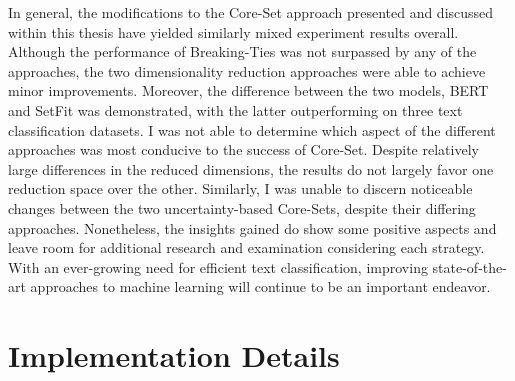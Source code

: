 \documentclass[english,bachelor,ul]{webisthesis} %
\begin{document}
In general, the modifications to the Core-Set approach presented and discussed within this thesis have yielded similarly mixed experiment results overall. Although the performance of Breaking-Ties was not surpassed by any of the approaches, the two dimensionality reduction approaches were able to achieve minor improvements. Moreover, the difference between the two models, BERT and SetFit was demonstrated, with the latter outperforming on three text classification datasets. I was not able to determine which aspect of the different approaches was most conducive to the success of Core-Set. Despite relatively large differences in the reduced dimensions, the results do not largely favor one reduction space over the other. Similarly, I was unable to discern noticeable changes between the two uncertainty-based Core-Sets, despite their differing approaches. Nonetheless, the insights gained do show some positive aspects and leave room for additional research and examination considering each strategy. With an ever-growing need for efficient text classification, improving state-of-the-art approaches to machine learning will continue to be an important endeavor.






%
%

%

\appendix
\chapter{Implementation Details}
\end{document}
